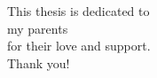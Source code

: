 \begin{dedication}
This thesis is dedicated to\\
 my parents\\
for their love and support.\\
Thank you!


\end{dedication}